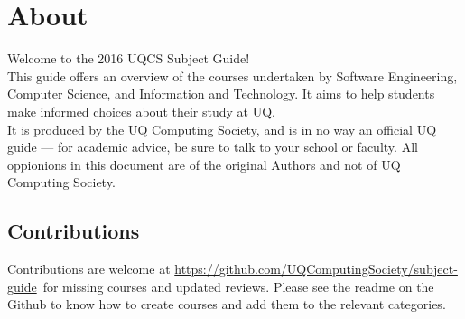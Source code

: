 \section{About}
\hypertarget{core:about}{}
Welcome to the 2016 UQCS Subject Guide!\\

\noindent
This guide offers an overview of the courses undertaken by Software Engineering, Computer Science, and Information and Technology.
It aims to help students make informed choices about their study at UQ.\\

\noindent
It is produced by the UQ Computing Society, and is in no way an official UQ guide --- for academic advice, be sure to talk to your school or faculty.
All oppionions in this document are of the original Authors and not of UQ Computing Society.

\subsection{Contributions}

Contributions are welcome at \href{https://github.com/UQComputingSociety/subject-guide}{https://github.com/UQComputingSociety/subject-guide}\ for missing courses and updated reviews. Please see the readme
on the Github to know how to create courses and add them to the relevant categories.